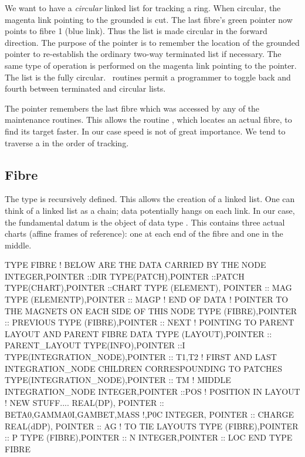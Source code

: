 We want to have a \emph{circular }linked list for tracking a ring. When
circular, the magenta link pointing to the grounded  is cut.
The last fibre's green pointer now points to fibre 1 (blue link). Thus the
list is made circular in the forward direction. The purpose of the 
 pointer is to remember the location of the grounded
 pointer to re-establish the ordinary two-way terminated list if
necessary. The same type of operation is performed on the magenta link
pointing to the  pointer. The list is the fully circular. \PTC\ routines
permit a programmer to toggle back and fourth between terminated and
circular lists.

The  pointer remembers the last fibre which was accessed by
any of the maintenance routines. This allows the routine , 
which locates an actual fibre, to find its target faster. In our case speed is
not of great importance. We tend to traverse a  in the order
of tracking.


\subsection{Fibre}

The type  is recursively defined. This allows the creation
of a linked list. One can think of a linked list as a chain; data potentially
hangs on each link. In our case, the fundamental datum is the object
 of data type . This contains three actual charts
(affine frames of reference): one at each end of the fibre and one in the middle.

\begin{ptccode}
TYPE FIBRE
  !  BELOW ARE THE DATA CARRIED BY THE NODE
  INTEGER,POINTER ::DIR
  TYPE(PATCH),POINTER ::PATCH
  TYPE(CHART),POINTER ::CHART
  TYPE (ELEMENT), POINTER ::  MAG
  TYPE (ELEMENTP),POINTER ::  MAGP
  !  END OF DATA
  !  POINTER TO THE MAGNETS ON EACH SIDE OF THIS NODE
  TYPE (FIBRE),POINTER :: PREVIOUS
  TYPE (FIBRE),POINTER :: NEXT
  !  POINTING TO PARENT LAYOUT AND PARENT FIBRE DATA
  TYPE (LAYOUT),POINTER :: PARENT_LAYOUT
  TYPE(INFO),POINTER ::I
  TYPE(INTEGRATION_NODE),POINTER :: T1,T2
  ! FIRST AND LAST INTEGRATION_NODE CHILDREN CORRESPOUNDING TO PATCHES
  TYPE(INTEGRATION_NODE),POINTER :: TM  ! MIDDLE INTEGRATION_NODE
  INTEGER,POINTER ::POS     ! POSITION IN LAYOUT
  ! NEW STUFF....
  REAL(DP), POINTER :: BETA0,GAMMA0I,GAMBET,MASS  !,P0C
  INTEGER, POINTER :: CHARGE
  REAL(dDP), POINTER :: AG
  ! TO TIE LAYOUTS
  TYPE (FIBRE),POINTER :: P
  TYPE (FIBRE),POINTER :: N
  INTEGER,POINTER :: LOC
END TYPE FIBRE
\end{ptccode}

